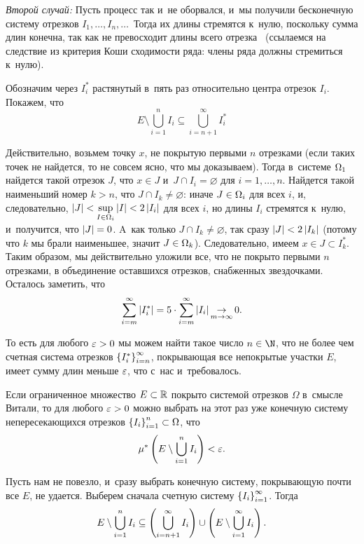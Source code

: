 \documentclass[draft]{article}
\begin{document}
\medskip

{\sl Второй случай:} Пусть процесс так и~не оборвался, и~мы получили
бесконечную систему отрезков $I_1,\dots,I_n,\dots\,$ Тогда их длины
стремятся к~нулю, поскольку сумма длин конечна, так как не
превосходит длины всего отрезка \ab\ (ссылаемся на следствие из
критерия Коши сходимости ряда: члены ряда должны стремиться к~нулю).

\smallskip

Обозначим через $I_i^*$ растянутый в~пять раз относительно центра
отрезок $I_i$. Покажем, что
$$E\setminus\bigcup\limits_{i=1}^n
I_i\subseteq  \bigcup\limits_{i=n+1}^\infty  I_i^*$$

Действительно, возьмем точку $x$, не покрытую первыми $n$ отрезками
(если таких точек не найдется, то не совсем ясно, что мы
доказываем). Тогда в~системе $\Omega_{1}$ найдется такой отрезок $J$, что
$x\in J$ и~$J\cap I_i=\varnothing$ для $i=1,\dots,n$. Найдется такой
наименьший номер $k > n$, что $J\cap I_k\neq\varnothing$: иначе
$J\in\Omega_{i}$ для всех $i$, и, следовательно,
$\left|J\right|<\sup\limits_{I\in\Omega_{i}}\left|I\right|<2\left|I_i\right|$ для всех $i$, но
длины $I_i$ стремятся к~нулю, и~получится, что $\left|J\right|=0$. A~как
только $J\cap I_k\neq\varnothing$, так сразу $\left|J\right|<2\left|I_{k}\right|$
(потому что $k$ мы брали наименьшее, значит $J\in\Omega_{k}$).
Следовательно, имеем $x\in J\subset I_k^*$. Таким образом, мы
действительно уложили все, что не покрыто первыми $n$ отрезками, в
объединение оставшихся отрезков, снабженных звездочками. Осталось
заметить, что
$$\sum_{i=m}^\infty\left|I_i^*\right|=5\cdot\sum_{i=m}^\infty
\left|I_i\right|\mathop{\to}\limits_{m\rightarrow\infty}0.$$

То есть для любого $\varepsilon > 0$ мы можем найти такое число $n\in\N$, что
не более чем счетная система отрезков $\left\{I_i^*\right\}_{i=n}^\infty$,
покрывающая все непокрытые участки $E$, имеет сумму длин меньше
$\varepsilon$, что с~нас и~требовалось.

\prtm

\bigskip


Если ограниченное множество $E\subset\mathbb{R}$ покрыто системой
отрезков $\Omega$ в~смысле Витали, то для любого $\varepsilon > 0$ можно
выбрать на этот раз уже конечную систему непересекающихся отрезков
$\left\{I_i\right\}_{i=1}^n\subset\Omega$, что
$$\mes\at(E\setminus\bigcup\limits_{i=1}^n I_i)<\ep.$$

\pr

Пусть нам не повезло, и~сразу выбрать конечную систему, покрывающую
почти все $E$, не удается. Выберем сначала счетную систему
$\left\{I_i\right\}_{i=1}^\infty$. Тогда
$$E\setminus\bigcup\limits_{i=1}^n I_i\subseteq
\at(\bigcup\limits_{i=n+1}^\infty I_i)\cup
\at(E\setminus\bigcup\limits_{i=1}^\infty I_i) .$$
\end{document}
